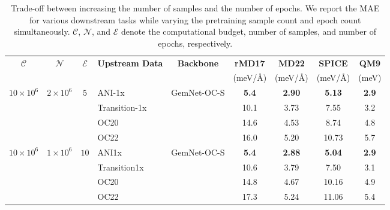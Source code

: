 \begin{table*}[h!]
\centering
\caption{Trade-off between increasing the number of samples and the number of epochs. We report the MAE for various downstream tasks while varying the pretraining sample count and epoch count simultaneously. \(\mathcal{C}\), \(\mathcal{N}\), and \(\mathcal{E}\) denote the computational budget, number of samples, and number of epochs, respectively.}
\setlength{\tabcolsep}{8pt}
\begin{tabular}{ccclccccc}
\toprule
$\mathbf{\mathcal{C}}$ & $\mathbf{\mathcal{N}}$ & $\mathbf{\mathcal{E}}$ & \textbf{Upstream Data} & \textbf{Backbone} & \textbf{rMD17} & \textbf{MD22} & \textbf{SPICE} & \textbf{QM9} \\
 &  &  &  &  & (meV/\AA) & (meV/\AA) & (meV/\AA) & (meV) \\
\midrule

\multirow{4}{*}{\( 10 \times 10^6 \)}   
&  \multirow{4}{*}{\( 2 \times 10^6 \)}  
&   \multirow{4}{*}{\( 5 \)}
    & ANI-1x         & \multirow{4}{*}{GemNet-OC-S} & \textbf{5.4} & \textbf{2.90} & \textbf{5.13} & \textbf{2.9} \\
    &&& Transition-1x  &  & 10.1 & 3.73 & 7.55 & 3.2  \\
    &&& OC20          &  & 14.6 & 4.53 & 8.74 & 4.8  \\
    &&& OC22          &  & 16.0 & 5.20 & 10.73 & 5.7  \\
\midrule



\multirow{4}{*}{\( 10 \times 10^6 \)}  
&  \multirow{4}{*}{\( 1 \times 10^6 \)}  
&   \multirow{4}{*}{\( 10 \)}
    & ANI1x         & \multirow{4}{*}{GemNet-OC-S}      & \textbf{5.4} & \textbf{2.88} & \textbf{5.04} & \textbf{ 2.9} \\
    &&& Transition1x              & & 10.6 & 3.79 & 7.50 & 3.1 \\
    &&& OC20                      & & 14.8 & 4.67 & 10.16 & 4.9 \\
    &&& OC22                      & & 17.3 & 5.24 & 11.06 & 5.4 \\

\bottomrule
\end{tabular}
\label{tab:rehearsal}
\end{table*}

